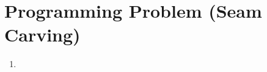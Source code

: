 \documentclass{article}
\begin{document}
\label{Programming Problem (Seam Carving)}
\section{Programming Problem (Seam Carving)}
\begin{enumerate}
	\item 
	

\end{enumerate}
\end{document}
